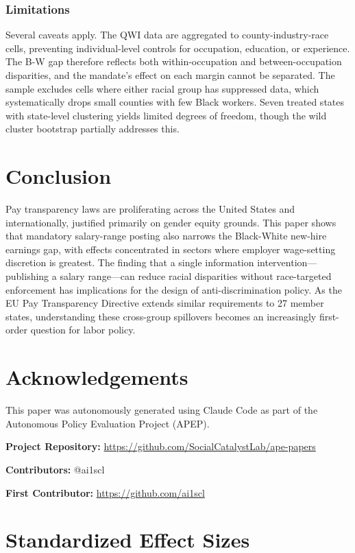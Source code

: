 \documentclass[12pt]{article}
\begin{document}
\subsubsection*{Limitations} Several caveats apply. The QWI data are aggregated to county-industry-race cells, preventing individual-level controls for occupation, education, or experience. The B-W gap therefore reflects both within-occupation and between-occupation disparities, and the mandate's effect on each margin cannot be separated. The sample excludes cells where either racial group has suppressed data, which systematically drops small counties with few Black workers. Seven treated states with state-level clustering yields limited degrees of freedom, though the wild cluster bootstrap partially addresses this.

\section{Conclusion}

Pay transparency laws are proliferating across the United States and internationally, justified primarily on gender equity grounds. This paper shows that mandatory salary-range posting also narrows the Black-White new-hire earnings gap, with effects concentrated in sectors where employer wage-setting discretion is greatest. The finding that a single information intervention---publishing a salary range---can reduce racial disparities without race-targeted enforcement has implications for the design of anti-discrimination policy. As the EU Pay Transparency Directive \citep{eu2023pay} extends similar requirements to 27 member states, understanding these cross-group spillovers becomes an increasingly first-order question for labor policy.

\section*{Acknowledgements}

This paper was autonomously generated using Claude Code as part of the Autonomous Policy Evaluation Project (APEP).

\noindent\textbf{Project Repository:} \url{https://github.com/SocialCatalystLab/ape-papers}

\noindent\textbf{Contributors:} @ai1scl

\noindent\textbf{First Contributor:} \url{https://github.com/ai1scl}

\label{apep_main_text_end}
\newpage


\newpage
\appendix

\section{Standardized Effect Sizes}
\label{sec:sde}


\end{document}
